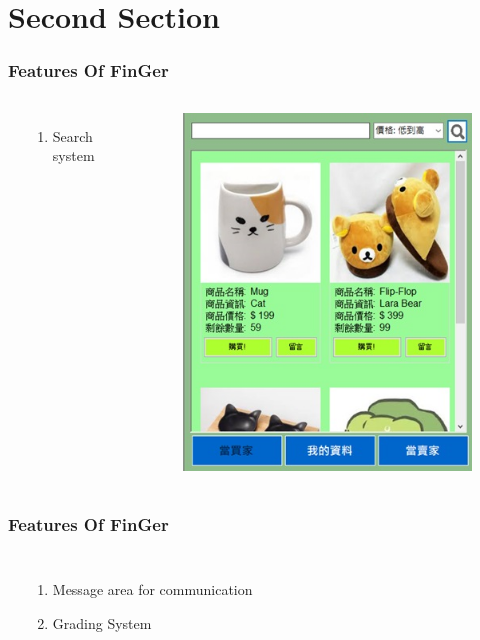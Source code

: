 \documentclass{beamer}
\begin{document}
\begin{CJK}{UTF8}{bsmi}
\begin{frame}
\end{frame}

\section{Second Section}

\begin{frame}
\frametitle{Features Of FinGer}
\begin{columns}[c]
\textbf{}
\begin{enumerate}
\item Search system
\end{enumerate}


\begin{figure}
\includegraphics[width=0.6\linewidth]{search.jpg}
\end{figure}

\end{columns}

\end{frame}


\begin{frame}
\frametitle{Features Of FinGer}
\begin{columns}[c]
\textbf{}
\begin{enumerate}
\item Message area for communication
\item Grading System
\end{enumerate}


\end{columns}
\end{frame}
\end{CJK}
\end{document}
